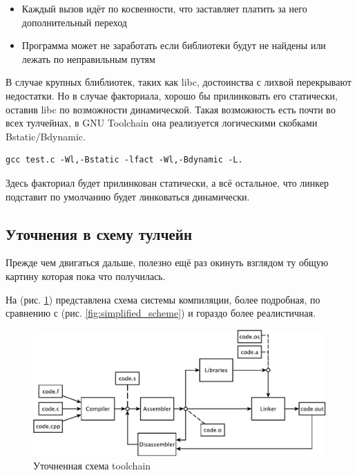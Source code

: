 \documentclass[a4paper,12pt,oneside]{article}
\begin{document}
\begin{itemize}
\item Каждый вызов идёт по косвенности, что заставляет платить за него дополнительный переход
\item Программа может не заработать если библиотеки будут не найдены или лежать по неправильным путям
\end{itemize}

В случае крупных блиблиотек, таких как libc, достоинства с лихвой перекрывают недостатки. Но в случае факториала, хорошо бы прилинковать его статически, оставив libc по возможности динамической. Такая возможность есть почти во всех тулчейнах, в GNU Toolchain она реализуется логическими скобками Bstatic/Bdynamic.

\begin{verbatim}
gcc test.c -Wl,-Bstatic -lfact -Wl,-Bdynamic -L.
\end{verbatim}

Здесь факториал будет прилинкован статически, а всё остальное, что линкер подставит по умолчанию будет линковаться динамически.

\subsection{Уточнения в схему тулчейн}

Прежде чем двигаться дальше, полезно ещё раз окинуть взглядом ту общую картину которая пока что получилась.

На (рис. \ref{fig:toolchain_completed}) представлена схема системы компиляции, более подробная, по сравнению с (рис. \ref{fig:simplified_scheme}) и гораздо более реалистичная.

\begin{figure}[ht]
\centering
\includegraphics[width=1.0\textwidth]{illustrations/mipt-scheme-crop.pdf}
\caption{Уточненная схема toolchain}
\label{fig:toolchain_completed}
\end{figure}
\end{document}
